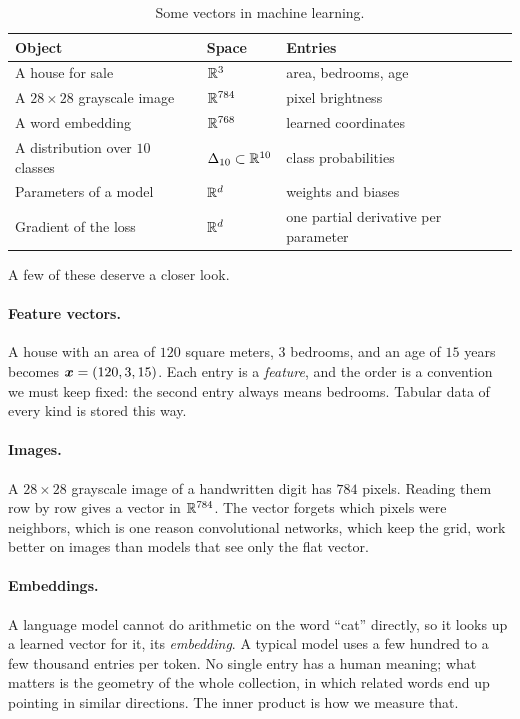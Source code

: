\begin{table}[ht]
  \centering
  \caption{Some vectors in machine learning.}
  \label{tab:ch03-vectors}
  \begin{tabular}{@{}lll@{}}
    \toprule
    Object & Space & Entries \\
    \midrule
    A house for sale & $\mathbb{R}^3$ & area, bedrooms, age \\
    A $28 \times 28$ grayscale image & $\mathbb{R}^{784}$ & pixel brightness \\
    A word embedding & $\mathbb{R}^{768}$ & learned coordinates \\
    A distribution over $10$ classes & $\Delta_{10} \subset \mathbb{R}^{10}$
      & class probabilities \\
    Parameters of a model & $\mathbb{R}^{d}$ & weights and biases \\
    Gradient of the loss & $\mathbb{R}^{d}$ & one partial derivative per parameter \\
    \bottomrule
  \end{tabular}
\end{table}

A few of these deserve a closer look.

\paragraph{Feature vectors.}
A house with an area of $120$ square meters, $3$ bedrooms, and an age of
$15$ years becomes $\bm{x} = (120, 3, 15)$. Each entry is a
\emph{feature}, and the order is a convention we must keep fixed: the
second entry always means bedrooms. Tabular data of every kind is stored
this way.

\paragraph{Images.}
A $28 \times 28$ grayscale image of a handwritten digit has $784$ pixels.
Reading them row by row gives a vector in $\mathbb{R}^{784}$. The vector forgets
which pixels were neighbors, which is one reason convolutional networks,
which keep the grid, work better on images than models that see only the
flat vector.

\paragraph{Embeddings.}
A language model cannot do arithmetic on the word ``cat'' directly, so it
looks up a learned vector for it, its \emph{embedding}. A typical model
uses a few hundred to a few thousand entries per token. No single entry
has a human meaning; what matters is the geometry of the whole
collection, in which related words end up pointing in similar directions.
The inner product is how we measure that.

